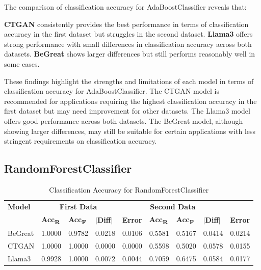 \vspace{0.5cm}

The comparison of classification accuracy for AdaBoostClassifier reveals that:

\textbf{CTGAN} consistently provides the best performance in terms of classification accuracy in the first dataset but struggles in the second dataset.
\textbf{Llama3} offers strong performance with small differences in classification accuracy across both datasets.
\textbf{BeGreat} shows larger differences but still performs reasonably well in some cases.

\vspace{0.5cm}

These findings highlight the strengths and limitations of each model in terms of classification accuracy for AdaBoostClassifier. The CTGAN model is recommended for applications requiring the highest classification accuracy in the first dataset but may need improvement for other datasets. The Llama3 model offers good performance across both datasets. The BeGreat model, although showing larger differences, may still be suitable for certain applications with less stringent requirements on classification accuracy.










\subsection{RandomForestClassifier}

\begin{table}[H]
\centering
\caption{Classification Accuracy for RandomForestClassifier}
\label{tab:random_forest_accuracy_combined}
\begin{tabularx}{\textwidth}{l*{8}{X}}
    \toprule
    \textbf{Model} & \multicolumn{3}{c}{\textbf{First Data}} & \multicolumn{4}{c}{\textbf{Second Data}} \\
    \cmidrule(lr){2-4} \cmidrule(lr){5-8}
    & \textbf{Acc\textsubscript{R}} & \textbf{Acc\textsubscript{F}} & \textbf{$|$Diff$|$} & \textbf{Error} & \textbf{Acc\textsubscript{R}} & \textbf{Acc\textsubscript{F}} & \textbf{$|$Diff$|$} & \textbf{Error} \\
    \midrule
    BeGreat & 1.0000 & 0.9782 & 0.0218 & 0.0106 & 0.5581 & 0.5167 & 0.0414 & 0.0214 \\
    CTGAN & 1.0000 & 1.0000 & 0.0000 & 0.0000 & 0.5598 & 0.5020 & 0.0578 & 0.0155 \\
    Llama3 & 0.9928 & 1.0000 & 0.0072 & 0.0044 & 0.7059 & 0.6475 & 0.0584 & 0.0177 \\
    \bottomrule
\end{tabularx}
\end{table}



